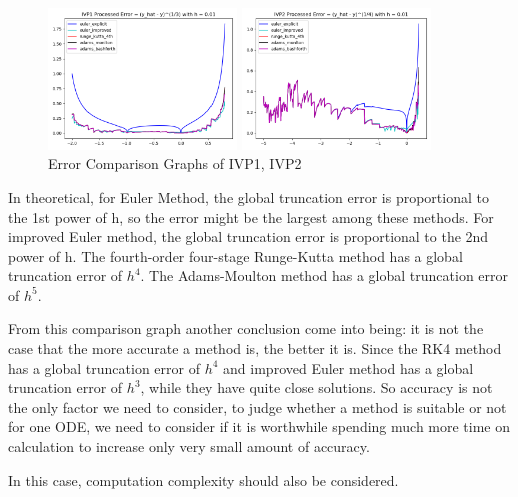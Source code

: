 \documentclass[a4paper]{article}
\begin{document}
	
	\begin{figure}[htbp]
		\subfigure 
		{
			\begin{minipage}{7cm}
				\centering      
				\includegraphics[width=5cm]{img/ivp1_error.png}
				\caption{\label{fig:ivp1_error} }
			\end{minipage}
		}
		\subfigure 
		{
			\begin{minipage}{7cm}
				\centering      
				\includegraphics[width=5cm]{img/ivp2_error.png}
				\caption{\label{fig:ivp2_error}}
			\end{minipage}
		}
		\caption{Error Comparison Graphs of IVP1, IVP2} 
	\end{figure}
	
	In theoretical, for Euler Method, the global truncation error is proportional to the 1st power of h, so the error might be the largest among these methods. For improved Euler method, the global truncation error is proportional to the 2nd power of h. The fourth-order four-stage Runge-Kutta method has a global truncation error of $h^4$. The Adams-Moulton method has a global truncation error of $h^5$.
	
	From this comparison graph another conclusion come into being: it is not the case that the more accurate a method is, the better it is. Since the RK4 method has a global truncation error of $h^4$ and improved Euler method has a global truncation error of $h^3$, while they have quite close solutions. So accuracy is not the only factor we need to consider, to judge whether a method is suitable or not for one ODE, we need to consider if it is worthwhile spending much more time on calculation to increase only very small amount of accuracy. 
	
	In this case, computation complexity should also be considered.
	
\end{document}
